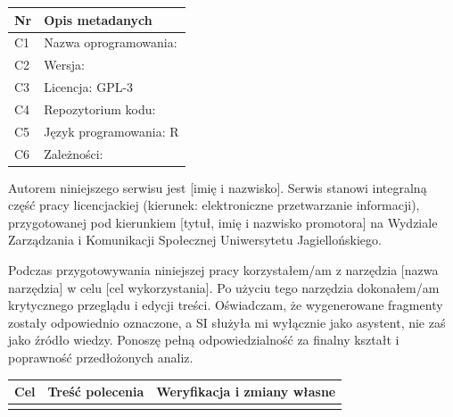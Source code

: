 \aneksy



\begin{tabular}{@{}ll@{}}
\toprule
Nr & Opis metadanych \\
\midrule
C1 & Nazwa oprogramowania: \\
C2 & Wersja: \\
C3 & Licencja: GPL-3 \\
C4 & Repozytorium kodu: \\
C5 & Język programowania: R \\
C6 & Zależności: \\
\bottomrule
\end{tabular}



Autorem niniejszego serwisu jest [imię i nazwisko]. Serwis stanowi integralną część pracy licencjackiej (kierunek: elektroniczne przetwarzanie informacji), przygotowanej pod kierunkiem [tytuł, imię i nazwisko promotora] na Wydziale Zarządzania i Komunikacji Społecznej Uniwersytetu Jagiellońskiego.



Podczas przygotowywania niniejszej pracy korzystałem/am z narzędzia [nazwa narzędzia] w celu [cel wykorzystania]. Po użyciu tego narzędzia dokonałem/am krytycznego przeglądu i edycji treści. Oświadczam, że wygenerowane fragmenty zostały odpowiednio oznaczone, a SI służyła mi wyłącznie jako asystent, nie zaś jako źródło wiedzy. Ponoszę pełną odpowiedzialność za finalny kształt i poprawność przedłożonych analiz.



\begin{tabular}{@{}p{}p{}p{}@{}}
\toprule
Cel & Treść polecenia & Weryfikacja i zmiany własne \\
\midrule
 & & \\
\bottomrule
\end{tabular}
